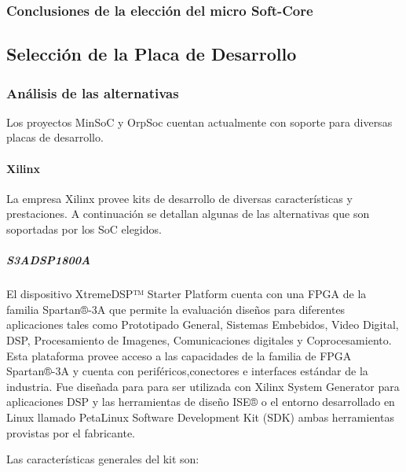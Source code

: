 				
				
				\subsubsection{Conclusiones de la elección del micro Soft-Core}
 			
 			
 			\subsection{Selección de la Placa de Desarrollo}
 				\subsubsection{Análisis de las alternativas} 
				Los proyectos MinSoC y OrpSoc cuentan actualmente con soporte para diversas placas de desarrollo. 
				\paragraph{Xilinx}
				La empresa Xilinx provee kits de desarrollo de diversas características y prestaciones. A continuación se detallan algunas de las alternativas que
				son soportadas por los SoC elegidos.
				\subparagraph{S3ADSP1800A}
				El dispositivo XtremeDSP™ Starter Platform cuenta con una FPGA de la familia Spartan®-3A que permite la evaluación diseños para diferentes
				aplicaciones tales como Prototipado General, Sistemas Embebidos, Video Digital, DSP, Procesamiento de Imagenes, Comunicaciones digitales y
				Coprocesamiento. Esta plataforma provee acceso a las capacidades de la familia de FPGA Spartan®-3A y cuenta con periféricos,conectores e
				interfaces estándar de la industria. Fue diseñada para para ser utilizada con Xilinx System Generator para aplicaciones DSP y las herramientas de
				diseño ISE® o el entorno desarrollado en Linux llamado PetaLinux Software Development Kit (SDK) ambas herramientas provistas por el fabricante. 
				
				Las características generales del kit son:
				
